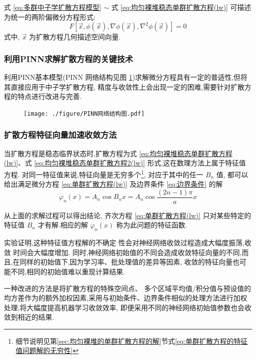 \documentclass{Sichuan Normal University}
\begin{document}
式 \eqref{eq:多群中子学扩散方程模型}  $\sim$ 式 \eqref{eq:均匀裸堆稳态单群扩散方程(lw)} 可描述为统一的两阶偏微分方程形式:
\begin{equation}
F\left[\vec{x}, \phi(\vec{x}), \nabla \phi(\vec{x}), \nabla^2 \phi(\vec{x})\right]=0
\end{equation}
式中, $\vec{x}$ 为扩散方程几何描述空间向量.

\subsubsection{利用PINN求解扩散方程的关键技术}
利用PINN基本模型(PINN 网络结构见图 \ref{fig:PINN Network Structure lw})求解微分方程具有一定的普适性,但将其直接应用于中子学扩散方程, 精度与收敛性上会出现一定的困难,需要针对扩散方程的特点进行改进与完善.
\begin{figure}[H]
    \centering
    \texttt{[image: ./figure/PINN网络结构图.pdf]}
    \label{fig:PINN Network Structure lw}
    \end{figure}
\subsubsection{扩散方程特征向量加速收敛方法}\label{sec:扩散方程特征向量加速收敛方法}
当扩散方程是稳态临界状态时,扩散方程为式 \eqref{eq:均匀裸堆稳态单群扩散方程(lw)}、式 \eqref{eq:均匀裸堆稳态单群扩散方程2(lw)} 形式,这在数理方法上属于特征值方程.
对同一特征值来说,特征向量是无穷多个\footnote{细节说明见第\ref{sec:均匀裸堆的单群扩散方程的解}节式\eqref{eq:单群扩散方程的特征值问题解的无穷性}}, 对应于其中的任一 $B_n$ 值, 都可以给出满足微分方程 \eqref{eq:单群扩散方程(lw)} 及边界条件 \eqref{eq:边界条件} 的解
\begin{equation}
\varphi_n(x)=A_n \cos B_n x=A_n \cos \frac{(2 n-1) \pi}{a} x
\label{eq:单群扩散方程的特征值问题解的无穷性}
\end{equation}

从上面的求解过程可以得出结论, 齐次方程 \eqref{eq:单群扩散方程(lw)} 只对某些特定的特征值 $B_n$ 才有解.相应的解 $\varphi_n(x)$ 称为此问题的特征函数.

实验证明,这种特征值方程解的不确定 性会对神经网络收敛过程造成大幅度振荡,收敛 时间会大幅度增加.
同时,神经网络初始值的不同会造成收敛特征向量的不同,而且,在同样的初始值下,因为学习率、批处理值的差异等因素, 收敛的特征向量也可能不同,相同的初始值难以重现计算结果.

一种改进的方法是将扩散方程的特殊空间点、 多个区域平均值/积分值与预设值的均方差作为的额外加权因素,采用与初始条件、边界条件相似的处理方法进行加权处理,将大幅度提高机器学习收敛效率,
即便采用不同的神经网络初始值参数也会收敛到相近的结果. 
\end{document}
